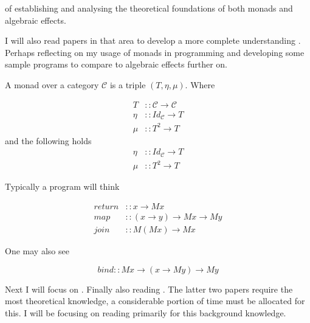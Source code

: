 \documentclass[a4paper,10pt]{article}
\begin{document}
of establishing and analysing the theoretical foundations of both monads and algebraic effects.




I will also read papers in that area to develop a more complete understanding
\cite{wadler2003marriage, wadler1994monads, PeytonJones:1993}.
Perhaps reflecting on my usage of monads in programming and developing some sample
programs to compare to algebraic effects further on.

A monad over a category $\mathcal{C}$ is a triple $(T,\eta,\mu)$. Where

\begin{equation}
  \begin{split}
    T    &:: \mathcal{C} \rightarrow \mathcal{C} \\
    \eta &:: Id_{\mathcal{C}} \rightarrow T       \\
    \mu  &:: T^{2} \rightarrow T
  \end{split}
\end{equation}
and the following holds
\begin{equation}
  \begin{split}
    \eta &:: Id_{\mathcal{C}} \rightarrow T       \\
    \mu  &:: T^{2} \rightarrow T
  \end{split}
\end{equation}


Typically a program will think

\begin{equation}
  \begin{split}
    return &:: x \rightarrow M x                                 \\
    map    &:: (x \rightarrow y) \rightarrow M x \rightarrow M y \\
    join   &:: M (M x) \rightarrow M x
  \end{split}
\end{equation}

One may also see

\begin{equation}
  bind :: M x \rightarrow (x \rightarrow M y) \rightarrow M y
\end{equation}






Next I will focus on \cite{Moggi:hc}.
Finally \cite{Plotkin:2001jr} also reading \cite{plotkin2001adequacy, Plotkin:2002dw}.
The latter two papers require the most theoretical knowledge, a considerable portion
of time must be allocated for this.
I will be focusing on reading primarily \cite{barr1990category} for this background knowledge.
\end{document}
